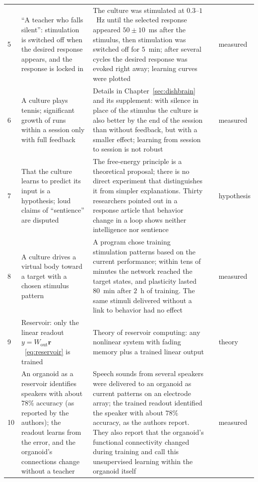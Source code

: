 {\begin{longtable}{>{\raggedright}p{0.5cm}>{\raggedright}p{4.0cm}>{\raggedright}p{5.6cm}>{\raggedright}p{2.3cm}>{\raggedright\arraybackslash}p{1.7cm}}
5 & ``A teacher who falls silent'': stimulation is switched off when the desired response appears, and the response is locked in & The culture was stimulated at $0.3$--$1$~Hz until the selected response appeared $50\pm10$~ms after the stimulus, then stimulation was switched off for $5$~min; after several cycles the desired response was evoked right away; learning curves were plotted & \cite{Shahaf2001} & measured \\
6 & A culture plays tennis; significant growth of runs within a session only with full feedback & Details in Chapter~\ref{sec:dishbrain} and its supplement: with silence in place of the stimulus the culture is also better by the end of the session than without feedback, but with a smaller effect; learning from session to session is not robust & \cite{Kagan2022} & measured \\
7 & That the culture learns to predict its input is a hypothesis; loud claims of ``sentience'' are disputed & The free-energy principle is a theoretical proposal; there is no direct experiment that distinguishes it from simpler explanations. Thirty researchers pointed out in a response article that behavior change in a loop shows neither intelligence nor sentience & \cite{Friston2010,Balci2023} & hypothesis \\
8 & A culture drives a virtual body toward a target with a chosen stimulus pattern & A program chose training stimulation patterns based on the current performance; within tens of minutes the network reached the target states, and plasticity lasted $80$~min after $2$~h of training. The same stimuli delivered without a link to behavior had no effect & \cite{Bakkum2008} & measured \\
9 & Reservoir: only the linear readout $y=W_{\text{out}}\mathbf r$~\eqref{eq:reservoir} is trained & Theory of reservoir computing: any nonlinear system with fading memory plus a trained linear output & \cite{Maass2002,JaegerHaas2004} & theory \\
10 & An organoid as a reservoir identifies speakers with about $78\%$ accuracy (as reported by the authors); the readout learns from the error, and the organoid's connections change without a teacher & Speech sounds from several speakers were delivered to an organoid as current patterns on an electrode array; the trained readout identified the speaker with about $78\%$ accuracy, as the authors report. They also report that the organoid's functional connectivity changed during training and call this unsupervised learning within the organoid itself & \cite{Cai2023} & measured \\

\end{longtable}}
